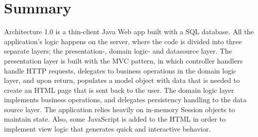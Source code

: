 \section{Summary}
Architecture 1.0 is a thin-client Java Web app built with a SQL database. All the application's logic happens on the server, where the code is divided into three separate layers; the presentation-, domain logic- and datasource layer. The presentation layer is built with the MVC pattern, in which controller handlers handle HTTP requests, delegates to business operations in the domain logic layer, and upon return, populates a model object with data that is needed to create an HTML page that is sent back to the user. The domain logic layer implements business operations, and delegates persistency handling to the data source layer. The application relies heavily on in-memory Session objects to maintain state. Also, some JavaScript is added to the HTML in order to implement view logic that generates quick and interactive behavior.
		
